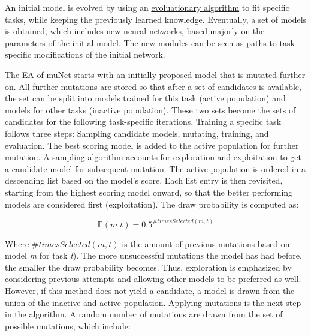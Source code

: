 \documentclass[
]{krantz}
\begin{document}
An initial model is evolved by using an \protect\hyperlink{03-03-EA}{evoluationary algorithm} to fit specific tasks, while keeping the previously learned knowledge.
Eventually, a set of models is obtained, which includes new neural networks, based majorly on the parameters of the initial model. The new modules can be seen as paths to task-specific
modifications of the initial network.

The EA of muNet starts with an initially proposed model that is mutated further on. All further mutations are stored so that after a set of candidates is available, the set can be split into
models trained for this task (active population) and models for other tasks (inactive population). These two sets become the sets of candidates for the following task-specific iterations.
Training a specific task follows three steps: Sampling candidate models, mutating, training, and evaluation. The best scoring model is added to the active population for further mutation.
A sampling algorithm accounts for exploration and exploitation to get a candidate model for subsequent mutation. The active population is ordered in a descending list based on the model's score.
Each list entry is then revisited, starting from the highest scoring model onward, so that the better performing models are considered first (exploitation). The draw probability is computed as:

\[\mathbb P(m|t) = 0.5 ^{ \#timesSelected(m, t)}\]

Where \(\#timesSelected(m, t)\) is the amount of previous mutations based on model \emph{m} for task \emph{t}). The more unsuccessful mutations the model has had before, the smaller the draw probability
becomes. Thus, exploration is emphasized by considering previous attempts and allowing other models to be preferred as well. However, if this method does not yield a candidate, a model is drawn from
the union of the inactive and active population.
Applying mutations is the next step in the algorithm. A random number of mutations are drawn from the set of possible mutations, which include:
\end{document}
